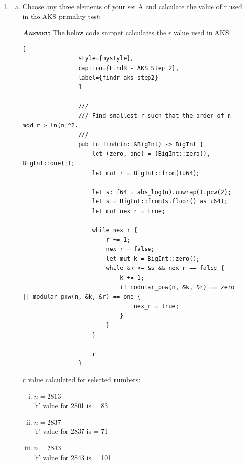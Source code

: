 \documentclass[11pt,a4paper]{article}
\begin{document}
\begin{enumerate}[1.]
		\bigbreak
		To find the numbers with Strong Liars using Miller-Rabin, execute the code using the below command:
		\begin{lstlisting}[style=DOS, caption=GCD Test Execution]

			.\target\release\nt-assignments.exe question3 -s 50 -e 100
		\end{lstlisting}


		\item
		\begin{enumerate}[(a)]
			\item Choose any three elements of your set A and calculate the value of r used in the AKS primality test;
			\begin{flushleft}
			\textbf{\textit{Answer:}} The below code snippet calculates the $r$ value used in AKS:

			\begin{lstlisting}[
				style={mystyle},
				caption={FindR - AKS Step 2},
				label={findr-aks-step2}
				]

				///
				/// Find smallest r such that the order of n mod r > ln(n)^2.
				///
				pub fn findr(n: &BigInt) -> BigInt {
					let (zero, one) = (BigInt::zero(), BigInt::one());
					let mut r = BigInt::from(1u64);

					let s: f64 = abs_log(n).unwrap().pow(2);
					let s = BigInt::from(s.floor() as u64);
					let mut nex_r = true;

					while nex_r {
						r += 1;
						nex_r = false;
						let mut k = BigInt::zero();
						while &k <= &s && nex_r == false {
							k += 1;
							if modular_pow(n, &k, &r) == zero || modular_pow(n, &k, &r) == one {
								nex_r = true;
							}
						}
					}

					r
				}
			\end{lstlisting}

			\bigbreak
			$r$ value calculated for selected numbers:
			\medskip
			\begin{enumerate}[i.]
				\item $n = 2813$ \\
				'r' value for 2801 is = 83
				\item $n = 2837$ \\
				'r' value for 2837 is = 71
				\item $n = 2843$ \\
				'r' value for 2843 is = 101
			\end{enumerate}
			\end{flushleft}


\end{enumerate}
\end{enumerate}
\end{document}
